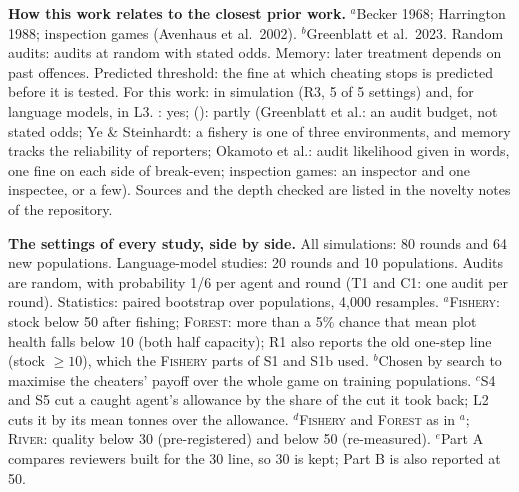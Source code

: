 \begin{table}[H]
  \centering\small
  \caption{\textbf{How this work relates to the closest prior work.} $^{a}$Becker 1968; Harrington 1988; inspection games (Avenhaus et al.\ 2002). $^{b}$Greenblatt et al.\ 2023. Random audits: audits at random with stated odds. Memory: later treatment depends on past offences. Predicted threshold: the fine at which cheating stops is predicted before it is tested. For this work: in simulation (R3, 5 of 5 settings) and, for language models, in L3. \checkmark: yes; (\checkmark): partly (Greenblatt et al.: an audit budget, not stated odds; Ye \& Steinhardt: a fishery is one of three environments, and memory tracks the reliability of reporters; Okamoto et al.: audit likelihood given in words, one fine on each side of break-even; inspection games: an inspector and one inspectee, or a few). Sources and the depth checked are listed in the novelty notes of the repository.}
  \label{tab:positioning}
  
\end{table}

\begin{table}[H]
  \centering\small
  \caption{\textbf{The settings of every study, side by side.} All simulations: 80 rounds and 64 new populations. Language-model studies: 20 rounds and 10 populations. Audits are random, with probability 1/6 per agent and round (T1 and C1: one audit per round). Statistics: paired bootstrap over populations, 4,000 resamples. $^a$\textsc{Fishery}: stock below 50 after fishing; \textsc{Forest}: more than a 5\% chance that mean plot health falls below 10 (both half capacity); R1 also reports the old one-step line (stock $\geq 10$), which the \textsc{Fishery} parts of S1 and S1b used. $^b$Chosen by search to maximise the cheaters' payoff over the whole game on training populations. $^c$S4 and S5 cut a caught agent's allowance by the share of the cut it took back; L2 cuts it by its mean tonnes over the allowance. $^d$\textsc{Fishery} and \textsc{Forest} as in $^a$; \textsc{River}: quality below 30 (pre-registered) and below 50 (re-measured). $^e$Part A compares reviewers built for the 30 line, so 30 is kept; Part B is also reported at 50.}
  \label{tab:settings}
  \resizebox{\textwidth}{!}{}
\end{table}

